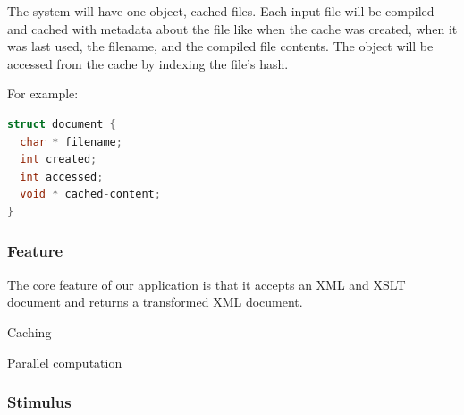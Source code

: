 The system will have one object, cached files.
Each input file will be compiled and cached with metadata about the file like when the cache was created, when it was last used, the filename, and the compiled file contents.
The object will be accessed from the cache by indexing the file's hash.

For example:
\begin{lstlisting}[language=c]
struct document {
  char * filename;
  int created;
  int accessed;
  void * cached-content;
}
\end{lstlisting}


\subsubsection{Feature}

The core feature of our application is that it accepts an XML and XSLT document and returns a transformed XML document.

Caching

Parallel computation


\subsubsection{Stimulus}

